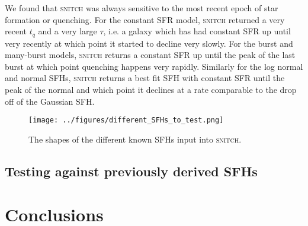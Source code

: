 \documentclass[useAMS,usenatbib]{mn2e}
\begin{document}
We found that \textsc{snitch} was always sensitive to the most recent epoch of star formation or quenching. For the constant SFR model, \textsc{snitch} returned a very recent $t_q$ and a very large $\tau$, i.e. a galaxy which has had constant SFR up until very recently at which point it started to decline very slowly. For the burst and many-burst models, \textsc{snitch} returns a constant SFR up until the peak of the last burst at which point quenching happens very rapidly. Similarly for the log normal and normal SFHs, \textsc{snitch} returns a best fit SFH with constant SFR until the peak of the normal and which point it declines at a rate comparable to the drop off of the Gaussian SFH. 

\begin{figure}
\centering
\texttt{[image: ../figures/different\_SFHs\_to\_test.png]}
\caption{The shapes of the different known SFHs input into \textsc{snitch}.}
\label{fig:differentSFHs}
\end{figure}

\subsection{Testing against previously derived SFHs}

\section{Conclusions}


  
\end{document}
